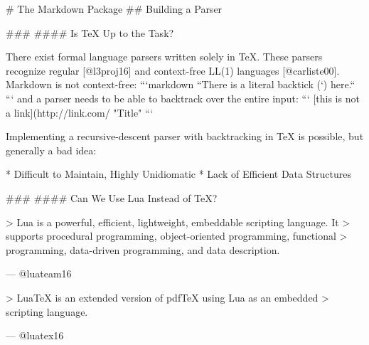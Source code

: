 \documentclass{beamer}
\begin{document}
\begin{darkframes}
\begin{frame}
\begin{get}
\end{frame}

# The Markdown Package
## Building a Parser

\begin{frame}

### \subsecname
#### Is \TeX{} Up to the Task?

There exist formal language parsers written solely in \TeX. These parsers
recognize regular [@l3proj16] and context-free LL(1) languages [@carliste00].
Markdown is not context-free:
```markdown
``There is a literal backtick (`) here.``
```
and a parser needs to be able to backtrack over the entire input:
```
[this is not a link](http://link.com/ "Title"
```

Implementing a recursive-descent parser with backtracking in \TeX{} is
possible, but generally a bad idea:

  * Difficult to Maintain, Highly Unidiomatic
  * Lack of Efficient Data Structures

\end{frame}
\begin{frame}

### \subsecname
#### Can We Use Lua Instead of \TeX?

> Lua is a powerful, efficient, lightweight, embeddable scripting language. It
> supports procedural programming, object-oriented programming, functional
> programming, data-driven programming, and data description. 

\hfill --- @luateam16
\vfill

> Lua\TeX{} is an extended version of pdf\TeX{} using Lua as an embedded
> scripting language.

\hfill --- @luatex16

\end{frame}
\begin{frame}


\end{frame}
\end{darkframes}
\end{document}
